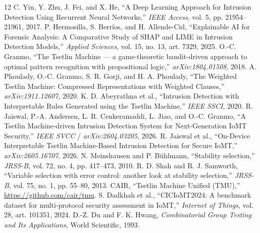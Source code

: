 \documentclass[conference]{IEEEtran}
\begin{document}
\begin{thebibliography}{12}
 C. Yin, Y. Zhu, J. Fei, and X. He,
``A Deep Learning Approach for Intrusion Detection Using Recurrent
Neural Networks,'' \emph{IEEE Access}, vol. 5, pp. 21954--21961, 2017.
 P. Hermosilla, S. Berr\'ios, and H. Allende-Cid,
``Explainable AI for Forensic Analysis: A Comparative Study of SHAP and
LIME in Intrusion Detection Models,'' \emph{Applied Sciences},
vol. 15, no. 13, art. 7329, 2025.
 O.-C. Granmo, ``The Tsetlin Machine --- a
game-theoretic bandit-driven approach to optimal pattern recognition with
propositional logic,'' \emph{arXiv:1804.01508}, 2018.
 A. Phoulady, O.-C. Granmo, S. R. Gorji, and H. A. Phoulady,
``The Weighted Tsetlin Machine: Compressed Representations with Weighted
Clauses,'' \emph{arXiv:1911.12607}, 2020.
 K. D. Abeyrathna et al., ``Intrusion Detection
with Interpretable Rules Generated using the Tsetlin Machine,'' \emph{IEEE
SSCI}, 2020.
 R. Jaiswal, P.-A. Andersen, L. R. Cenkeramaddi,
L. Jiao, and O.-C. Granmo, ``A Tsetlin Machine-driven Intrusion Detection
System for Next-Generation IoMT Security,'' \emph{IEEE SVCC} /
\emph{arXiv:2604.03205}, 2026.
 R. Jaiswal et al., ``On-Device Interpretable
Tsetlin Machine-Based Intrusion Detection for Secure IoMT,''
\emph{arXiv:2605.16707}, 2026.
 N. Meinshausen and P. B\"uhlmann, ``Stability
selection,'' \emph{JRSS-B}, vol. 72, no. 4, pp. 417--473, 2010.
 R. D. Shah and R. J. Samworth, ``Variable selection with error
control: another look at stability selection,'' \emph{JRSS-B}, vol. 75,
no. 1, pp. 55--80, 2013.
 CAIR, ``Tsetlin Machine Unified (TMU),'' \url{https://github.com/cair/tmu}.
 S. Dadkhah et al., ``CICIoMT2024: A benchmark dataset
for multi-protocol security assessment in IoMT,'' \emph{Internet of Things},
vol. 28, art. 101351, 2024.
 D.-Z. Du and F. K. Hwang, \emph{Combinatorial Group Testing
and Its Applications}, World Scientific, 1993.
\end{thebibliography}
\end{document}
